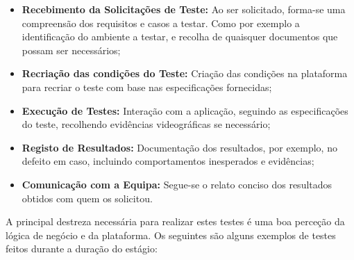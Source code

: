         \begin{itemize}
            \item \textbf{Recebimento da Solicitações de Teste:} Ao ser solicitado, forma-se uma compreensão dos requisitos e casos a testar. Como por exemplo a identificação do ambiente a testar, e recolha de quaisquer documentos que possam ser necessários;
            \item \textbf{Recriação das condições do Teste:} Criação das condições na plataforma para recriar o teste com base nas especificações fornecidas;
            \item \textbf{Execução de Testes:} Interação com a aplicação, seguindo as especificações do teste, recolhendo evidências videográficas se necessário;
            \item \textbf{Registo de Resultados:} Documentação dos resultados, por exemplo, no defeito em caso, incluindo comportamentos inesperados e evidências;
            \item \textbf{Comunicação com a Equipa:} Segue-se o relato conciso dos resultados obtidos com quem os solicitou.
        \end{itemize}

        A principal destreza necessária para realizar estes testes é uma boa perceção da lógica de negócio e da plataforma. Os seguintes são alguns exemplos de testes feitos durante a duração do estágio:

